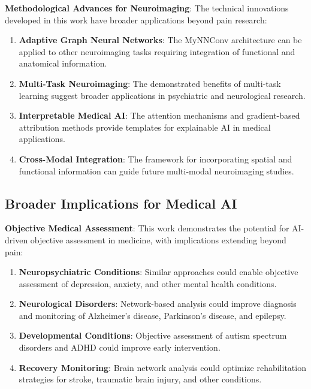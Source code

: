 \documentclass[10pt,journal,compsoc]{IEEEtran}
\begin{document}
\textbf{Methodological Advances for Neuroimaging}:
The technical innovations developed in this work have broader applications beyond pain research:

\begin{enumerate}
\item \textbf{Adaptive Graph Neural Networks}: The MyNNConv architecture can be applied to other neuroimaging tasks requiring integration of functional and anatomical information.

\item \textbf{Multi-Task Neuroimaging}: The demonstrated benefits of multi-task learning suggest broader applications in psychiatric and neurological research.

\item \textbf{Interpretable Medical AI}: The attention mechanisms and gradient-based attribution methods provide templates for explainable AI in medical applications.

\item \textbf{Cross-Modal Integration}: The framework for incorporating spatial and functional information can guide future multi-modal neuroimaging studies.
\end{enumerate}

\subsection{Broader Implications for Medical AI}

\textbf{Objective Medical Assessment}:
This work demonstrates the potential for AI-driven objective assessment in medicine, with implications extending beyond pain:

\begin{enumerate}
\item \textbf{Neuropsychiatric Conditions}: Similar approaches could enable objective assessment of depression, anxiety, and other mental health conditions.

\item \textbf{Neurological Disorders}: Network-based analysis could improve diagnosis and monitoring of Alzheimer's disease, Parkinson's disease, and epilepsy.

\item \textbf{Developmental Conditions}: Objective assessment of autism spectrum disorders and ADHD could improve early intervention.

\item \textbf{Recovery Monitoring}: Brain network analysis could optimize rehabilitation strategies for stroke, traumatic brain injury, and other conditions.
\end{enumerate}
\end{document}
